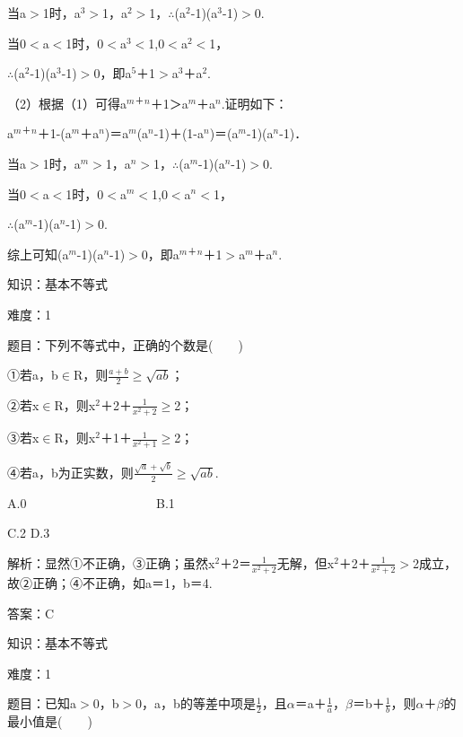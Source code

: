 \documentclass{article} %
\begin{document}
当a$\mathrm{>}$1时，a${}^{3}$$\mathrm{>}$1，a${}^{2}$$\mathrm{>}$1，$\mathrm{\therefore}$(a${}^{2}$-1)(a${}^{3}$-1)$\mathrm{>}$0.

当0$\mathrm{<}$a$\mathrm{<}$1时，0$\mathrm{<}$a${}^{3}$$\mathrm{<}$1,0$\mathrm{<}$a${}^{2}$$\mathrm{<}$1，

$\mathrm{\therefore}$(a${}^{2}$-1)(a${}^{3}$-1)$\mathrm{>}$0，即a${}^{5}$＋1$\mathrm{>}$a${}^{3}$＋a${}^{2}$.

（2）根据（1）可得a${}^{m}$${}^{\textrm{＋}}$${}^{n}$＋1＞a${}^{m}$＋a${}^{n}$.证明如下：

a${}^{m}$${}^{\textrm{＋}}$${}^{n}$＋1-(a${}^{m}$＋a${}^{n}$)＝a${}^{m}$(a${}^{n}$-1)＋(1-a${}^{n}$)＝(a${}^{m}$-1)(a${}^{n}$-1)．

当a$\mathrm{>}$1时，a${}^{m}$$\mathrm{>}$1，a${}^{n}$$\mathrm{>}$1，$\mathrm{\therefore}$(a${}^{m}$-1)(a${}^{n}$-1)$\mathrm{>}$0.

当0$\mathrm{<}$a$\mathrm{<}$1时，0$\mathrm{<}$a${}^{m}$$\mathrm{<}$1,0$\mathrm{<}$a${}^{n}$$\mathrm{<}$1，

$\mathrm{\therefore}$(a${}^{m}$-1)(a${}^{n}$-1)$\mathrm{>}$0.

综上可知(a${}^{m}$-1)(a${}^{n}$-1)$\mathrm{>}$0，即a${}^{m}$${}^{\textrm{＋}}$${}^{n}$＋1$\mathrm{>}$a${}^{m}$＋a${}^{n}$.



知识：基本不等式

难度：1

题目：下列不等式中，正确的个数是(　　)

①若a，b$\mathrm{\in}$R，则$\frac{a+b}{2}$$\mathrm{\ge}$$\sqrt{ab}$；

②若x$\mathrm{\in}$R，则x${}^{2}$＋2＋$\frac{1}{x^2+2}$$\mathrm{\ge}$2；

③若x$\mathrm{\in}$R，则x${}^{2}$＋1＋$\frac{1}{x^2+1}$$\mathrm{\ge}$2；

④若a，b为正实数，则$\frac{\sqrt{a}+\sqrt{b}}{2}$$\mathrm{\ge}$$\sqrt{ab}$.

A.0　　　　　　　　　　  B.1  

C.2  D.3

解析：显然①不正确，③正确；虽然x${}^{2}$＋2＝$\frac{1}{x^2+2}$无解，但x${}^{2}$＋2＋$\frac{1}{x^2+2}$$\mathrm{>}$2成立，故②正确；④不正确，如a＝1，b＝4.

答案：C



知识：基本不等式

难度：1

题目：已知a$\mathrm{>}$0，b$\mathrm{>}$0，a，b的等差中项是$\frac{1}{2}$，且$\alpha$＝a＋$\frac{1}{a}$，$\beta$＝b＋$\frac{1}{b}$，则$\alpha$＋$\beta$的最小值是(　　)
\end{document}
